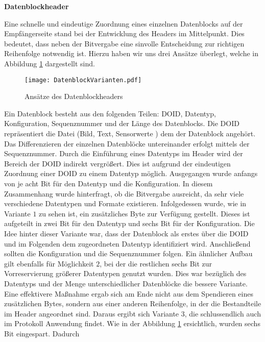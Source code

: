 \textbf{Datenblockheader}

Eine schnelle und eindeutige Zuordnung eines einzelnen Datenblocks auf der
Empfängerseite stand bei der Entwicklung des Headers im Mittelpunkt.
Dies bedeutet, dass neben der Bitvergabe eine sinvolle Entscheidung zur
richtigen Reihenfolge notwendig ist. Hierzu haben wir uns drei Ansätze überlegt,
welche in Abbildung \ref{fig:DatenblockVarianten} dargestellt sind.

\begin{figure}[H]
	\centering
	\texttt{[image: DatenblockVarianten.pdf]}
	\caption{Ansätze des Datenblockheaders}
  \label{fig:DatenblockVarianten}
\end{figure}

Ein Datenblock besteht aus den folgenden Teilen: \gls{DOID}, Datentyp,
Konfiguration, Sequenznummer und der Länge des Datenblocks. Die \gls{DOID}
repräsentiert die Datei (Bild, Text, Sensorwerte \etc) dem der Datenblock
angehört. Das Differenzieren der einzelnen Datenblöcke untereinander erfolgt
mittels der Sequenznummer. Durch die Einführung eines Datentyps im Header wird
der Bereich der \gls{DOID} indirekt vergrößert. Dies ist aufgrund der
eindeutigen Zuordnung einer \gls{DOID} zu einem Datentyp möglich.
\newline
Ausgegangen wurde anfangs von je acht Bit für den Datentyp und
die Konfiguration.
In diesem Zusammenhang wurde hinterfragt, ob die Bitvergabe ausreicht,
da sehr viele verschiedene Datentypen und Formate existieren. Infolgedessen
wurde, wie in Variante $1$ zu sehen ist, ein zusätzliches Byte zur Verfügung
gestellt. Dieses ist aufgeteilt in zwei Bit für den Datentyp und sechs Bit für
der Konfiguration. Die Idee hinter dieser Variante war, dass der Datenblock als
erstes über die \gls{DOID} und im Folgenden dem zugeordneten Datentyp identifiziert
wird. Anschließend sollten die Konfiguration und die Sequenznummer folgen.
\newline
Ein ähnlicher Aufbau gilt ebenfalls für Möglichkeit $2$, bei der die restlichen
sechs Bit zur Vorreservierung größerer Datentypen genutzt wurden. Dies war
bezüglich des Datentyps und der Menge unterschiedlicher Datenblöcke die bessere
Variante. 
\newline
Eine effektivere Maßnahme ergab sich am Ende nicht aus dem Spendieren eines
zusätzlichen Bytes, sondern aus einer anderen Reihenfolge, in der die
Bestandteile im Header angeordnet sind. Daraus ergibt sich Variante $3$, die
schlussendlich auch im Protokoll Anwendung findet. Wie in der Abbildung
\ref{fig:DatenblockVarianten} ersichtlich, wurden sechs Bit eingespart. Dadurch
